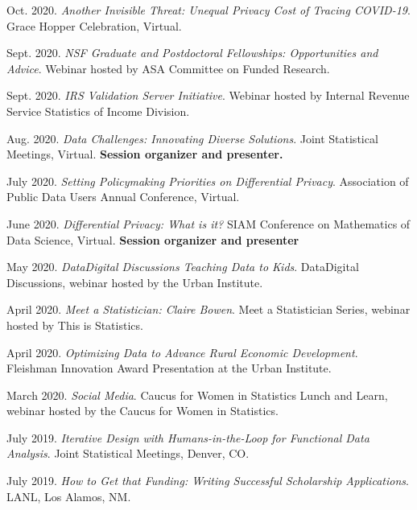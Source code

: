 \begin{etaremune}[topsep=0pt, itemsep=3pt, partopsep=0pt, parsep=0pt]
    \item Oct. 2020. \textit{Another Invisible Threat: Unequal Privacy Cost of Tracing COVID-19}. Grace Hopper Celebration, Virtual.
    
    \item Sept. 2020. \textit{NSF Graduate and Postdoctoral Fellowships: Opportunities and Advice}. Webinar hosted by ASA Committee on Funded Research.
    
    \item Sept. 2020. \textit{IRS Validation Server Initiative}. Webinar hosted by Internal Revenue Service Statistics of Income Division.
    
    \item Aug. 2020. \textit{Data Challenges: Innovating Diverse Solutions}. Joint Statistical Meetings, Virtual. \textbf{Session organizer and presenter.}
    
    \item July 2020. \textit{Setting Policymaking Priorities on Differential Privacy}. Association of Public Data Users Annual Conference, Virtual.
    
    \item June 2020. \textit{Differential Privacy: What is it?} SIAM Conference on Mathematics of Data Science, Virtual. \textbf{Session organizer and presenter}
    
    \item May 2020. \textit{Data\@Urban Digital Discussions Teaching Data to Kids}. Data\@Urban Digital Discussions, webinar hosted by the Urban Institute.
    
    \item April 2020. \textit{Meet a Statistician: Claire Bowen}. Meet a Statistician Series, webinar hosted by This is Statistics.
    
    \item April 2020. \textit{Optimizing Data to Advance Rural Economic Development}. Fleishman Innovation Award Presentation at the Urban Institute.
    
    \item March 2020. \textit{Social Media}. Caucus for Women in Statistics Lunch and Learn, webinar hosted by the Caucus for Women in Statistics.
    
    \item July 2019. \textit{Iterative Design with Humans-in-the-Loop for Functional Data Analysis}. Joint Statistical Meetings, Denver, CO. 
    
    \item July 2019. \textit{How to Get that Funding: Writing Successful Scholarship Applications}. LANL, Los Alamos, NM.
    

\end{etaremune}
